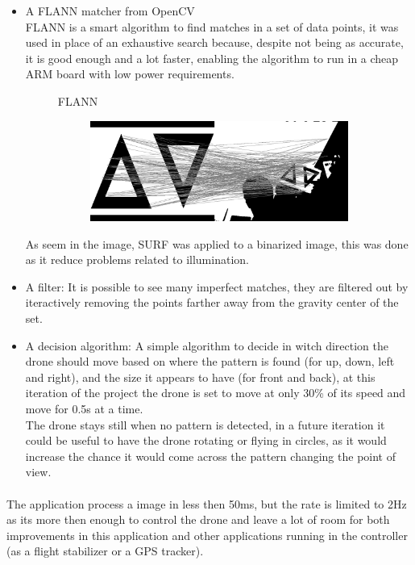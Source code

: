 \documentclass[11pt,twoside,a4paper]{article}
\begin{document}
\begin{itemize}
  \item A FLANN matcher from OpenCV\\
FLANN is a smart algorithm to find matches in a set of data points, it was used
in place of an exhaustive search because, despite not being as accurate, it is
good enough and a lot faster, enabling the algorithm to run in a cheap ARM board
with low power requirements.
\begin{figure}[hbtp]
  \centering
FLANN
\begin{subfigure}{1.00\textwidth}
  \centering
  \includegraphics[width=1.00\linewidth]{matches.jpg}
\end{subfigure}
\end{figure}
As seem in the image, SURF was applied to a binarized image, this was done as it
reduce problems related to illumination.

  \item A filter: It is possible to see many imperfect matches, they are
filtered out by iteractively removing the points farther away from the gravity
center of the set.

  \item A decision algorithm: A simple algorithm to decide in witch direction
the drone should move based on where the pattern is found (for up, down, left
and right), and the size it appears to have (for front and back), at this
iteration of the project the drone is set to move at only 30\% of its speed
and move for 0.5s at a time.\\
The drone stays still when no pattern is detected, in a future iteration it
could be useful to have the drone rotating or flying in circles, as it would
increase the chance it would come across the pattern changing the point of
view.
\end{itemize}
\paragraph{} The application process a image in less then 50ms, but the rate is
limited to 2Hz as its more then enough to control the drone and leave a lot of
room for both improvements in this application and other applications running in
the controller (as a flight stabilizer or a GPS tracker).
\end{document}
